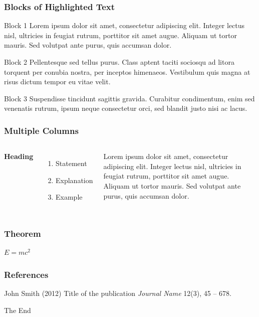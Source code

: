 \documentclass{beamer}
\begin{document}
\begin{frame}
\frametitle{Blocks of Highlighted Text}
\begin{block}{Block 1}
Lorem ipsum dolor sit amet, consectetur adipiscing elit. Integer lectus nisl, ultricies in feugiat rutrum, porttitor sit amet augue. Aliquam ut tortor mauris. Sed volutpat ante purus, quis accumsan dolor.
\end{block}

\begin{block}{Block 2}
Pellentesque sed tellus purus. Class aptent taciti sociosqu ad litora torquent per conubia nostra, per inceptos himenaeos. Vestibulum quis magna at risus dictum tempor eu vitae velit.
\end{block}

\begin{block}{Block 3}
Suspendisse tincidunt sagittis gravida. Curabitur condimentum, enim sed venenatis rutrum, ipsum neque consectetur orci, sed blandit justo nisi ac lacus.
\end{block}
\end{frame}


\begin{frame}
\frametitle{Multiple Columns}
\begin{columns}[c] %

\textbf{Heading}
\begin{enumerate}
\item Statement
\item Explanation
\item Example
\end{enumerate}

Lorem ipsum dolor sit amet, consectetur adipiscing elit. Integer lectus nisl, ultricies in feugiat rutrum, porttitor sit amet augue. Aliquam ut tortor mauris. Sed volutpat ante purus, quis accumsan dolor.

\end{columns}
\end{frame}


\begin{frame}
\frametitle{Theorem}
\begin{theorem}
$E = mc^2$
\end{theorem}
\end{frame}


\begin{frame}
\frametitle{References}
\footnotesize{
\begin{thebibliography}{99} %
 John Smith (2012)
\newblock Title of the publication
\newblock \emph{Journal Name} 12(3), 45 -- 678.
\end{thebibliography}
}
\end{frame}


\begin{frame}
\Huge{\centerline{The End}}
\end{frame}
\end{document}

